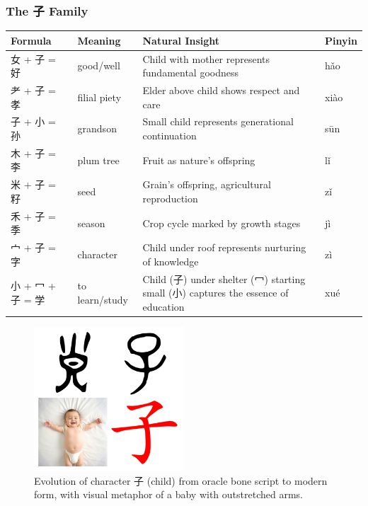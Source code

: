 \documentclass[11pt,letterpaper]{article}
\begin{document}
\subsubsection{The 子 Family}\label{the-ux5b50-family}

\begin{longtable}{|p{3cm}|p{3cm}|p{6cm}|p{2cm}|}
\hline
\textbf{Formula} & \textbf{Meaning} & \textbf{Natural Insight} & \textbf{Pinyin} \\
\hline
女 + 子 = 好 & good/well & Child with mother represents fundamental
goodness & hǎo \\
\hline
耂 + 子 = 孝 & filial piety & Elder above child shows respect and care &
xiào \\
\hline
子 + 小 = 孙 & grandson & Small child represents generational
continuation & sūn \\
\hline
木 + 子 = 李 & plum tree & Fruit as nature's offspring & lǐ \\
\hline
米 + 子 = 籽 & seed & Grain's offspring, agricultural reproduction &
zǐ \\
\hline
禾 + 子 = 季 & season & Crop cycle marked by growth stages & jì \\
\hline
宀 + 子 = 字 & character & Child under roof represents nurturing of
knowledge & zì \\
\hline
小 + 冖 + 子 = 学 & to learn/study & Child (子) under shelter (冖)
starting small (小) captures the essence of education & xué \\
\hline
\end{longtable}

\begin{figure}
\centering
\includegraphics[width=0.5\textwidth]{./images/zi_child.png}
\caption{Evolution of character 子 (child) from oracle bone script to
modern form, with visual metaphor of a baby with outstretched arms.}
\end{figure}
\end{document}
